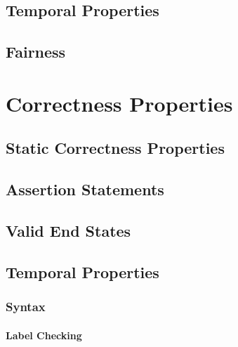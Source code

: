 \documentclass[a4paper, 11pt, accentcolor = tud3b]{tudreport}
\begin{document}
            \subsection{Temporal Properties} %

            \subsection{Fairness} %

        \section{Correctness Properties} %

            \subsection{Static Correctness Properties} %

            \subsection{Assertion Statements} %

            \subsection{Valid End States} %

            \subsection{Temporal Properties} %

                \subsubsection{Syntax} %

                    \paragraph{Label Checking} %
\end{document}
